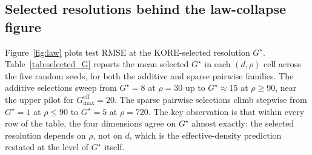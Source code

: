 \documentclass{article}
\newcommand{\KORE}{\textsc{KORE}}
\begin{document}
\subsection{Selected resolutions behind the law-collapse figure}
\label{app:selected_G}

Figure~\ref{fig:law} plots test RMSE at the \KORE{}-selected resolution $G^\star$. Table~\ref{tab:selected_G} reports the mean selected $G^\star$ in each $(d, \rho)$ cell across the five random seeds, for both the additive and sparse pairwise families. The additive selections sweep from $G^\star = 8$ at $\rho = 30$ up to $G^\star \approx 15$ at $\rho \ge 90$, near the upper pilot for $G_{\max}^{\mathrm{eff}} = 20$. The sparse pairwise selections climb stepwise from $G^\star = 1$ at $\rho \le 90$ to $G^\star = 5$ at $\rho = 720$. The key observation is that within every row of the table, the four dimensions agree on $G^\star$ almost exactly: the selected resolution depends on $\rho$, not on $d$, which is the effective-density prediction restated at the level of $G^\star$ itself.
\end{document}

